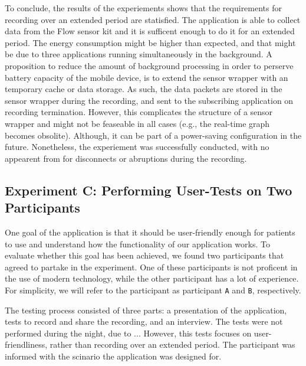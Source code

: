 To conclude, the results of the experiements shows that the requirements for recording over an extended period are statisfied. The application is able to collect data from the Flow sensor kit and it is sufficent enough to do it for an extended period. The energy consumption might be higher than expected, and that might be due to three applications running simultaneously in the background. A proposition to reduce the amount of background processing in order to perserve battery capacity of the mobile device, is to extend the sensor wrapper with an temporary cache or data storage. As such, the data packets are stored in the sensor wrapper during the recording, and sent to the subscribing application on recording termination. However, this complicates the structure of a sensor wrapper and might not be feaseable in all cases (e.g., the real-time graph becomes obsolite). Although, it can be part of a power-saving configuration in the future.  Nonetheless, the experiement was successfully conducted, with no appearent from for disconnects or abruptions during the recording. 

\subsection{Experiment C: Performing User-Tests on Two Participants}
One goal of the application is that it should be user-friendly enough for patients to use and understand how the functionality of our application works. To evaluate whether this goal has been achieved, we found two participants that agreed to partake in the experiment. One of these participants is not proficent in the use of modern technology, while the other participant has a lot of experience. For simplicity, we will refer to the participant as participant \verb|A| and \verb|B|, respectively. 

The testing process consisted of three parts: a presentation of the application, tests to record and share the recording, and an interview. The tests were not performed during the night, due to ... However, this tests focuses on user-friendliness, rather than recording over an extended period. The participant was informed with the scinario the application was designed for. 

